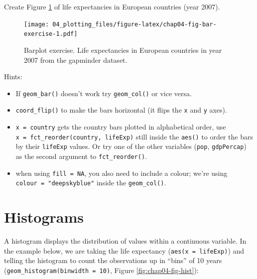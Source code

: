 \documentclass[
  12pt,
  krantz2]{krantz}
\makeatletter
\newenvironment{Shaded}{\begin{snugshade}}{\end{snugshade}}
\newcommand{\DataTypeTok}[1]{\textcolor[rgb]{0.13,0.29,0.53}{#1}}
\newcommand{\DecValTok}[1]{\textcolor[rgb]{0.00,0.00,0.81}{#1}}
\newcommand{\KeywordTok}[1]{\textcolor[rgb]{0.13,0.29,0.53}{\textbf{#1}}}
\newcommand{\NormalTok}[1]{#1}
\newcommand{\OperatorTok}[1]{\textcolor[rgb]{0.81,0.36,0.00}{\textbf{#1}}}
\newcommand{\StringTok}[1]{\textcolor[rgb]{0.31,0.60,0.02}{#1}}
\providecommand{\tightlist}{%
  \setlength{\itemsep}{0pt}\setlength{\parskip}{0pt}}
\newenvironment{kframe}{%
\medskip{}
\setlength{\fboxsep}{.8em}
 \def\at@end@of@kframe{}%
 \ifinner\ifhmode%
  \def\at@end@of@kframe{\end{minipage}}%
  \begin{minipage}{\columnwidth}%
 \fi\fi%
 \def\FrameCommand##1{\hskip\@totalleftmargin \hskip-\fboxsep
 \colorbox{shadecolor}{##1}\hskip-\fboxsep
     \hskip-\linewidth \hskip-\@totalleftmargin \hskip\columnwidth}%
 \MakeFramed {\advance\hsize-\width
   \@totalleftmargin\z@ \linewidth\hsize
   \@setminipage}}%
 {\par\unskip\endMakeFramed%
 \at@end@of@kframe}
\renewenvironment{Shaded}{\begin{kframe}}{\end{kframe}}
\makeatother
\begin{document}
Create Figure \ref{fig:chap04-fig-bar-exercise} of life expectancies in European countries (year 2007).

\begin{figure}
\centering
\texttt{[image: 04\_plotting\_files/figure-latex/chap04-fig-bar-exercise-1.pdf]}
\caption{\label{fig:chap04-fig-bar-exercise}Barplot exercise. Life expectancies in European countries in year 2007 from the gapminder dataset.}
\end{figure}

Hints:

\begin{itemize}
\tightlist
\item
  If \texttt{geom\_bar()} doesn't work try \texttt{geom\_col()} or vice versa.
\item
  \texttt{coord\_flip()} to make the bars horizontal (it flips the \texttt{x} and \texttt{y} axes).
\item
  \texttt{x\ =\ country} gets the country bars plotted in alphabetical order, use \texttt{x\ =\ fct\_reorder(country,\ lifeExp)} still inside the \texttt{aes()} to order the bars by their \texttt{lifeExp} values. Or try one of the other variables (\texttt{pop}, \texttt{gdpPercap}) as the second argument to \texttt{fct\_reorder()}.
\item
  when using \texttt{fill\ =\ NA}, you also need to include a colour; we're using \texttt{colour\ =\ "deepskyblue"} inside the \texttt{geom\_col()}.
\end{itemize}

\FloatBarrier

\hypertarget{histograms}{%
\section{Histograms}\label{histograms}}


A histogram displays the distribution of values within a continuous variable.
In the example below, we are taking the life expectancy (\texttt{aes(x\ =\ lifeExp)}) and telling the histogram to count the observations up in ``bins'' of 10 years (\texttt{geom\_histogram(binwidth\ =\ 10)}, Figure \ref{fig:chap04-fig-hist}):

\begin{Shaded}
\end{Shaded}
\end{document}
